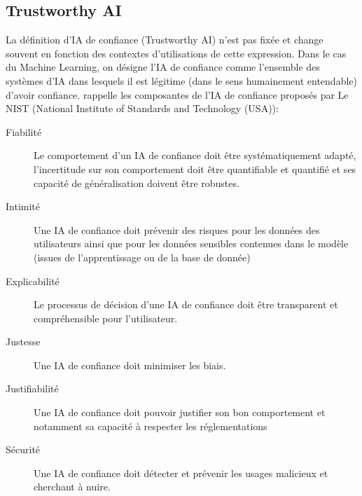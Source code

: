     \subsection{Trustworthy AI}


        La définition d'IA de confiance (Trustworthy AI) n'est pas fixée et change souvent en fonction des contextes d'utilisations de cette expression. Dans le cas du Machine Learning, on désigne l'IA de confiance comme l'ensemble des systèmes d'IA dans lesquels il est légitime (dans le sens humainement entendable) d'avoir confiance. \cite{ni_towards_2025} rappelle les composantes de l'IA de confiance proposés par Le NIST (National Institute of Standards and Technology (USA)):

        \begin{description}
                \item[Fiabilité] Le comportement d'un IA de confiance doit être systématiquement adapté, l'incertitude sur son comportement doit être quantifiable et quantifié et ses capacité de généralisation doivent être robustes.
                \item[Intimité] Une IA de confiance doit prévenir des risques pour les données des utilisateurs ainsi que pour les données sensibles contenues dans le modèle (issues de l'apprentissage ou de la base de donnée)
                \item[Explicabilité] Le processus de décision d'une IA de confiance doit être transparent et compréhensible pour l'utilisateur.
                \item[Justesse] Une IA de confiance doit minimiser les biais.
                \item[Justifiabilité] Une IA de confiance doit pouvoir justifier son bon comportement et notamment sa capacité à respecter les réglementations
                \item[Sécurité] Une IA de confiance doit détecter et prévenir les usages malicieux et cherchant à nuire.
        \end{description}

